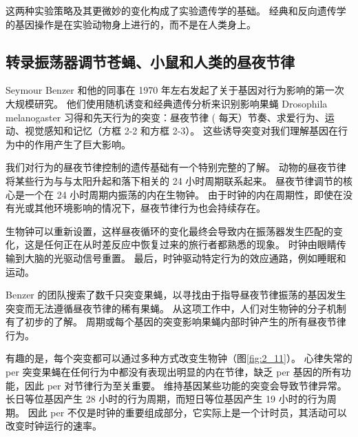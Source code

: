 这两种实验策略及其更微妙的变化构成了实验遗传学的基础。 
经典和反向遗传学的基因操作是在实验动物身上进行的，而不是在人类身上。


\subsection{转录振荡器调节苍蝇、小鼠和人类的昼夜节律}
Seymour Benzer 和他的同事在 1970 年左右发起了关于基因对行为影响的第一次大规模研究。
他们使用随机诱变和经典遗传分析来识别影响果蝇 Drosophila melanogaster 习得和先天行为的突变：昼夜节律 ( 每天）节奏、求爱行为、运动、视觉感知和记忆（方框 2-2 和方框 2-3）。 
这些诱导突变对我们理解基因在行为中的作用产生了巨大影响。


我们对行为的昼夜节律控制的遗传基础有一个特别完整的了解。 
动物的昼夜节律将某些行为与与太阳升起和落下相关的 24 小时周期联系起来。 
昼夜节律调节的核心是一个在 24 小时周期内振荡的内在生物钟。 
由于时钟的内在周期性，即使在没有光或其他环境影响的情况下，昼夜节律行为也会持续存在。


生物钟可以重新设置，这样昼夜循环的变化最终会导致内在振荡器发生匹配的变化，这是任何正在从时差反应中恢复过来的旅行者都熟悉的现象。 
时钟由眼睛传输到大脑的光驱动信号重置。 
最后，时钟驱动特定行为的效应通路，例如睡眠和运动。


Benzer 的团队搜索了数千只突变果蝇，以寻找由于指导昼夜节律振荡的基因发生突变而无法遵循昼夜节律的稀有果蝇。 
从这项工作中，人们对生物钟的分子机制有了初步的了解。 
周期或每个基因的突变影响果蝇内部时钟产生的所有昼夜节律行为。


有趣的是，每个突变都可以通过多种方式改变生物钟（图\ref{fig:2_11}）。 
心律失常的 per 突变果蝇在任何行为中都没有表现出明显的内在节律，缺乏 per 基因的所有功能，因此 per 对节律行为至关重要。 
维持基因某些功能的突变会导致节律异常。 
长日等位基因产生 28 小时的行为周期，而短日等位基因产生 19 小时的行为周期。 
因此 per 不仅是时钟的重要组成部分，它实际上是一个计时员，其活动可以改变时钟运行的速率。

